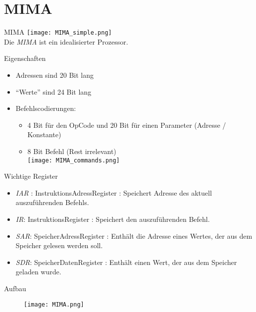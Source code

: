 \section{MIMA}

\begin{frame}{MIMA}
	\texttt{[image: MIMA\_simple.png]}\\
	Die \emph{MIMA} ist ein idealisierter Prozessor. 
\end{frame}

\begin{frame}{Eigenschaften}
	\begin{itemize}[<+->]
		\item Adressen sind 20 Bit lang
		\item \enquote{Werte} sind 24 Bit lang
		\item Befehlscodierungen:
		\begin{itemize}
			\item 4 Bit für den OpCode und 20 Bit für einen Parameter (Adresse / Konstante)
			\item 8 Bit Befehl (Rest irrelevant)\\
			\texttt{[image: MIMA\_commands.png]}\\
		\end{itemize} 
	\end{itemize}
\end{frame}


\begin{frame}{Wichtige Register}
	\begin{itemize}[<+->]
		\item \emph{IAR} : InstruktionsAdressRegister : Speichert Adresse des aktuell auszuführenden Befehls.
		\item \emph{IR}: InstruktionsRegister : Speichert den auszuführenden Befehl.
		\item \emph{SAR}: SpeicherAdressRegister : Enthält die Adresse eines Wertes, der aus dem Speicher gelesen werden soll.
		\item \emph{SDR}: SpeicherDatenRegister : Enthält einen Wert, der aus dem Speicher geladen wurde.
	\end{itemize}
\end{frame}

\begin{frame}{Aufbau}
	\begin{figure}
		\centering
		\texttt{[image: MIMA.png]}
	\end{figure}
\end{frame}

